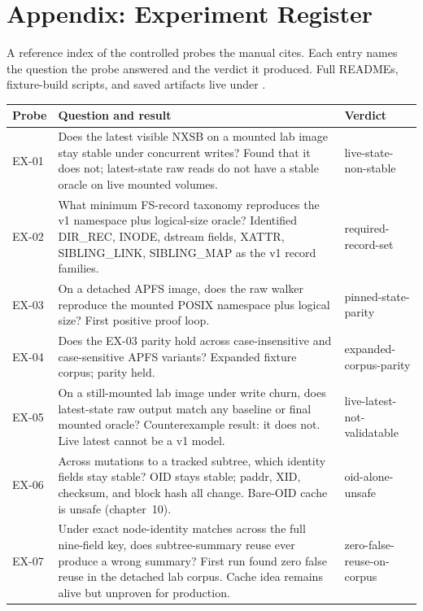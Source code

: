 \chapter*{Appendix: Experiment Register}

A reference index of the controlled probes the manual cites. Each
entry names the question the probe answered and the verdict it
produced. Full READMEs, fixture-build scripts, and saved artifacts
live under .

\begin{longtable}{p{}p{}p{}}
\textbf{Probe} & \textbf{Question and result} & \textbf{Verdict} \\
\hline
\endhead

EX-01 &
Does the latest visible NXSB on a mounted lab image stay stable under
concurrent writes? Found that it does not; latest-state raw reads do
not have a stable oracle on live mounted volumes.
& live-state-non-stable \\

EX-02 &
What minimum FS-record taxonomy reproduces the v1 namespace plus
logical-size oracle? Identified DIR\_REC, INODE, dstream fields,
XATTR, SIBLING\_LINK, SIBLING\_MAP as the v1 record families.
& required-record-set \\

EX-03 &
On a detached APFS image, does the raw walker reproduce the mounted
POSIX namespace plus logical size? First positive proof loop.
& pinned-state-parity \\

EX-04 &
Does the EX-03 parity hold across case-insensitive and case-sensitive
APFS variants? Expanded fixture corpus; parity held.
& expanded-corpus-parity \\

EX-05 &
On a still-mounted lab image under write churn, does latest-state
raw output match any baseline or final mounted oracle? Counterexample
result: it does not. Live latest cannot be a v1 model.
& live-latest-not-validatable \\

EX-06 &
Across mutations to a tracked subtree, which identity fields stay
stable? OID stays stable; paddr, XID, checksum, and block hash all
change. Bare-OID cache is unsafe (chapter~10).
& oid-alone-unsafe \\

EX-07 &
Under exact node-identity matches across the full nine-field key,
does subtree-summary reuse ever produce a wrong summary? First run
found zero false reuse in the detached lab corpus. Cache idea
remains alive but unproven for production.
& zero-false-reuse-on-corpus \\


\end{longtable}
